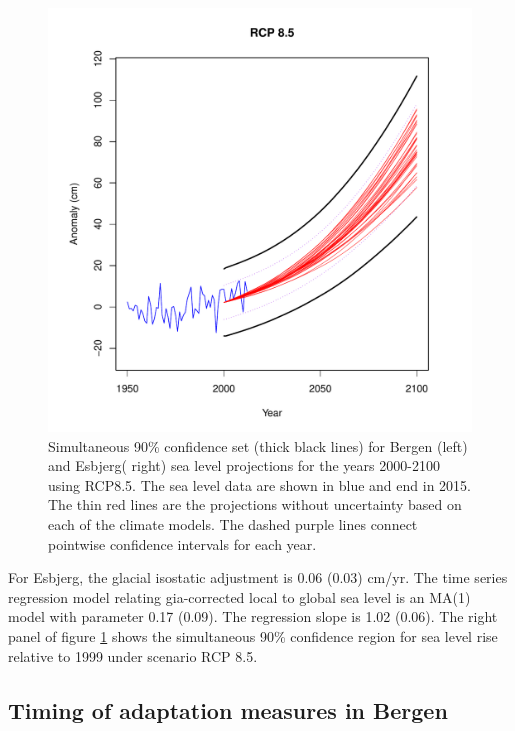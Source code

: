 \documentclass[draft,linenumbers]{agujournal}
\begin{document}
\begin{figure}[!hbpt]
\begin{center}
\begin{minipage}{.5\textwidth}
    \includegraphics[width=\linewidth]{esbjerg_ci.pdf}

\end{minipage}
\caption{Simultaneous 90\% confidence set (thick black lines) for Bergen (left) and Esbjerg( right) sea level projections for the years 2000-2100 using RCP8.5. The sea level data are shown in blue and end in 2015. The thin red lines are the projections without uncertainty based on each of the climate models. The dashed purple lines connect pointwise confidence intervals for each year. }
\label{fig:ci}
\end{center}
\end{figure}

For Esbjerg, the glacial isostatic adjustment is 0.06 (0.03) cm/yr. The time series regression model relating gia-corrected local to global sea level is an MA(1) model with parameter 0.17 (0.09). The regression slope is 1.02 (0.06). The right panel of figure \ref{fig:ci} shows the simultaneous 90\% confidence region for sea level rise relative to 1999 under scenario RCP 8.5.

\subsection{Timing of adaptation measures in Bergen}
\end{document}
